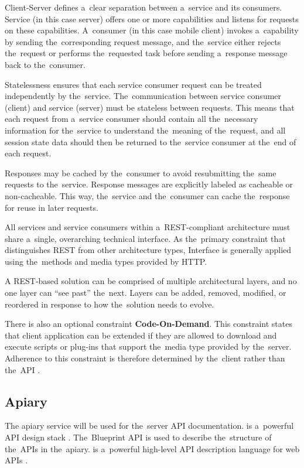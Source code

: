 \begin{itemize}

Client-Server defines a~clear separation between a~service and its consumers. Service (in this case server) offers one
or more capabilities and listens for requests on these capabilities. A~consumer (in this case mobile client) invokes
a~capability by sending the~corresponding request message, and the~service either rejects the~request or performs
the~requested task before sending a~response message back to the~consumer.

Statelessness ensures that each service consumer request can be treated independently by the~service. The~communication
between service consumer (client) and service (server) must be stateless between requests. This means that each request
from a~service consumer should contain all the~necessary information for the~service to understand the~meaning of
the~request, and all session state data should then be returned to the~service consumer at the~end of each request.

Responses may be cached by the~consumer to avoid resubmitting the~same requests to the~service. Response messages are
explicitly labeled as cacheable or non-cacheable. This way, the~service and the~consumer can cache the~response for
reuse in later requests.

All services and service consumers within a~REST-compliant architecture must share a~single, overarching technical
interface. As the~primary constraint that distinguishes REST from other architecture types, Interface is generally
applied using the~methods and media types provided by HTTP.

A REST-based solution can be comprised of multiple architectural layers, and no one layer can ``see past'' the~next.
Layers can be added, removed, modified, or reordered in response to how the~solution needs to evolve.

\end{itemize}

There is also an optional constraint \textbf{Code-On-Demand}. This constraint states that client application can be
extended if they are allowed to download and execute scripts or plug-ins that support the~media type provided by
the~server. Adherence to this constraint is therefore determined by the~client rather than the~API \cite{rest}.
\pagebreak

\subsection{Apiary}
The apiary service will be used for the~server API documentation.  is a~powerful API design stack
\cite{apiary}. The~Blueprint API is used to describe the~structure of the~APIs in the~apiary.
 is a~powerful high-level API description language for web APIs \cite{apiblueprint}.

